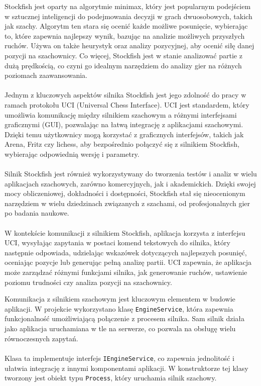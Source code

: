 \documentclass[twoside]{projektInzynierskiMS1}
\begin{document}
\noindent
Stockfish jest oparty na algorytmie minimax, który jest popularnym podejściem w sztucznej inteligencji do podejmowania decyzji w grach dwuosobowych, takich jak szachy. Algorytm ten stara się ocenić każde możliwe posunięcie, wybierając to, które zapewnia najlepszy wynik, bazując na analizie możliwych przyszłych ruchów. Używa on także heurystyk oraz analizy pozycyjnej, aby ocenić siłę danej pozycji na szachownicy. Co więcej, Stockfish jest w stanie analizować partie z dużą prędkością, co czyni go idealnym narzędziem do analizy gier na różnych poziomach zaawansowania.
\\\\
Jednym z kluczowych aspektów silnika Stockfish jest jego zdolność do pracy w ramach protokołu UCI (Universal Chess Interface). UCI jest standardem, który umożliwia komunikację między silnikiem szachowym a różnymi interfejsami graficznymi (GUI), pozwalając na łatwą integrację z aplikacjami szachowymi. Dzięki temu użytkownicy mogą korzystać z graficznych interfejsów, takich jak Arena, Fritz czy lichess, aby bezpośrednio połączyć się z silnikiem Stockfish, wybierając odpowiednią wersję i parametry.
\\\\
Silnik Stockfish jest również wykorzystywany do tworzenia testów i analiz w wielu aplikacjach szachowych, zarówno komercyjnych, jak i akademickich. Dzięki swojej mocy obliczeniowej, dokładności i dostępności, Stockfish stał się nieocenionym narzędziem w wielu dziedzinach związanych z szachami, od profesjonalnych gier po badania naukowe.
\\\\
W kontekście komunikacji z silnikiem Stockfish, aplikacja korzysta z interfejsu UCI, wysyłając zapytania w postaci komend tekstowych do silnika, który następnie odpowiada, udzielając wskazówek dotyczących najlepszych posunięć, oceniając pozycje lub generując pełną analizę partii. UCI zapewnia, że aplikacja może zarządzać różnymi funkcjami silnika, jak generowanie ruchów, ustawienie poziomu trudności czy analiza pozycji na szachownicy.

\newpage

\noindent
Komunikacja z silnikiem szachowym jest kluczowym elementem w budowie aplikacji. W projekcie wykorzystano klasę \texttt{EngineService}, która zapewnia funkcjonalność umożliwiającą połączenie z procesem silnika. Sam silnik działa jako aplikacja uruchamiana w tle na serwerze, co pozwala na obsługę wielu równoczesnych zapytań.
\\\\
Klasa ta implementuje interfejs \texttt{IEngineService}, co zapewnia jednolitość i ułatwia integrację z innymi komponentami aplikacji. W konstruktorze tej klasy tworzony jest obiekt typu \texttt{Process}, który uruchamia silnik szachowy.
\end{document}
